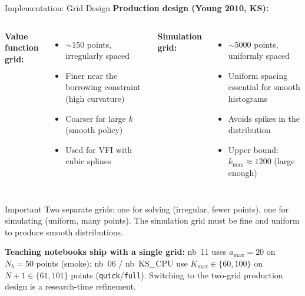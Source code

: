 \documentclass[aspectratio=169,11pt]{beamer}
\newcommand{\emphc}[1]{\textcolor{harvardcrimson}{#1}}
\begin{document}
\begin{frame}{Implementation: Grid Design}
\textbf{Production design (Young 2010, KS):}

\vspace{0.5em}
\begin{columns}[T]
\textbf{Value function grid:}
\begin{itemize}
    \item $\sim$150 points, \emphc{irregularly spaced}
    \item Finer near the borrowing constraint (high curvature)
    \item Coarser for large $k$ (smooth policy)
    \item Used for VFI with cubic splines
\end{itemize}

\textbf{Simulation grid:}
\begin{itemize}
    \item $\sim$5000 points, \emphc{uniformly spaced}
    \item Uniform spacing essential for smooth histograms
    \item Avoids spikes in the distribution
    \item Upper bound: $k_{\max} \approx 1200$ (large enough)
\end{itemize}
\end{columns}

\vspace{0.5em}
\begin{alertblock}{Important}
\emphc{Two separate grids}: one for solving (irregular, fewer points), one for simulating (uniform, many points). The simulation grid must be fine and uniform to produce smooth distributions.
\end{alertblock}

\vspace{0.3em}
{\footnotesize \textbf{Teaching notebooks ship with a single grid:} nb~11 uses $a_{\max}=20$ on $N_b=50$ points (smoke); nb~06 / nb~KS\_CPU use $K_{\max}\in\{60,100\}$ on $N+1\in\{61,101\}$ points (\texttt{quick}/\texttt{full}).  Switching to the two-grid production design is a research-time refinement.}
\end{frame}
\end{document}
